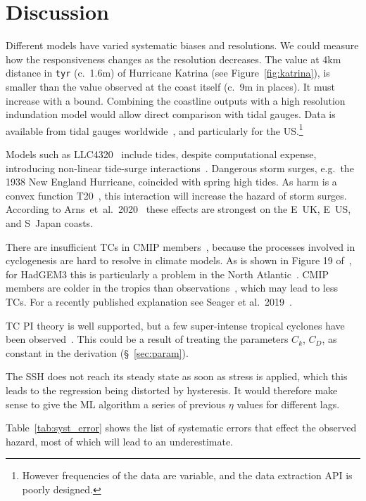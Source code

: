 \section{Discussion}
\label{sec:7_Discussion}

\label{sec:future}

Different models have varied systematic biases
and resolutions. We could measure how
the responsiveness changes as the resolution decreases. The value at 4km distance in
\texttt{tyr} (c.~1.6m) of Hurricane Katrina (see Figure~\ref{fig:katrina}),
is smaller than the value observed at the coast itself (c.~9m in places).
It must increase with a bound.
Combining the coastline outputs with a high resolution indundation model
would allow direct comparison with tidal gauges.
Data is available from tidal gauges worldwide~\cite{tadesse2020data, arns2020non},
and particularly for the US.\footnote{
However frequencies of the data are variable,
and the data extraction API is poorly designed.}

Models such as LLC4320~\cite{Abernathey2017}  include tides,
 despite computational expense,
introducing non-linear tide-surge interactions~\cite{
feng2019characteristics, arns2020non}.
Dangerous storm surges, e.g.~the 1938 New England
Hurricane, coincided with spring high tides.
As harm is a convex function T20~\cite{taleb2019statistical, Taleb2012AntifragileH},
this interaction will increase the hazard of storm surges.
According to Arns~et~al.~2020~\cite{arns2020non}
these effects are strongest on the E~UK,
E~US, and S~Japan coasts.

There are insufficient TCs in CMIP members~\cite{camargo2013global},
because the processes involved
in cyclogenesis are hard to resolve in climate models.
As is shown in Figure 19 of~\cite{williams2018met},
 for HadGEM3 this is particularly a problem in the North Atlantic~\cite{tomassini2017interaction}. %
CMIP members are colder in the tropics than observations~\cite{camargo2013global},
which may lead to less TCs.
For a recently published explanation see Seager et al.~2019~\cite{seager2019strengthening}.


TC PI theory is well supported,
but a few super-intense tropical cyclones have been observed~\cite{camargo2019tropical}.
This could be a result of treating the parameters $C_k$, $C_D$, as constant in the derivation (§~\ref{sec:param}).

The SSH does not reach its steady state as soon as
stress is applied, which this leads
to the regression being distorted by hysteresis.
It would therefore make sense to give the ML algorithm
a series of previous $\eta$ values for different lags.


\label{sec:sys-errors}
Table~\ref{tab:syst_error} shows the list of systematic errors that effect the
observed hazard, most of which will lead to an underestimate.


